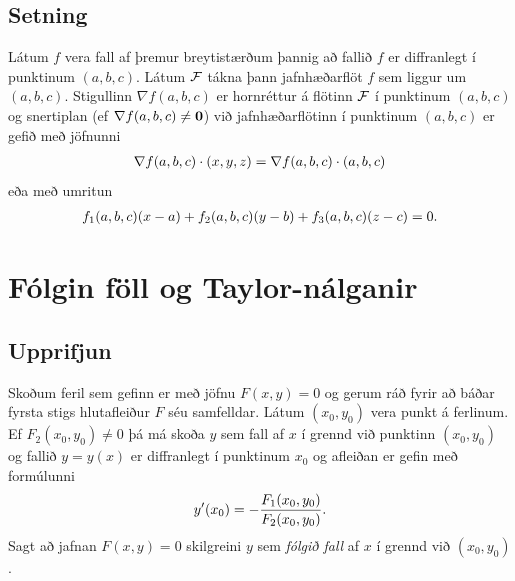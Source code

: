 \documentclass[a4paper,10pt,icelandic]{sphinxmanual}
\begin{document}
\subsection{Setning}
\label{Kafli2:id48}
Látum \(f\) vera fall af þremur breytistærðum þannig að fallið
\(f\) er diffranlegt í punktinum \((a,b,c)\). Látum
\(\cal F\) tákna þann jafnhæðarflöt \(f\) sem liggur um
\((a,b,c)\). Stigullinn \(\nabla f(a,b,c)\) er hornréttur á
flötinn \(\cal F\) í punktinum \((a,b,c)\) og snertiplan (ef
\(\nabla f(a,b,c)\neq\mbox{${\bf 0}$}\)) við jafnhæðarflötinn í
punktinum \((a,b,c)\) er gefið með jöfnunni
\begin{gather}
\begin{split}\displaystyle \nabla f(a,b,c)\cdot(x,y,z)=\nabla f(a,b,c)\cdot(a,b,c)\end{split}\notag
\end{gather}
eða með umritun
\begin{gather}
\begin{split}\displaystyle f_1(a,b,c)(x-a)+f_2(a,b,c)(y-b)+f_3(a,b,c)(z-c)=0.\end{split}\notag
\end{gather}

\section{Fólgin föll og Taylor-nálganir}
\label{Kafli2:folgin-foll-og-taylor-nalganir}

\subsection{Upprifjun}
\label{Kafli2:upprifjun}\label{Kafli2:index-25}
Skoðum feril sem gefinn er með jöfnu \(F(x,y)=0\) og gerum ráð fyrir
að báðar fyrsta stigs hlutafleiður \(F\) séu samfelldar. Látum
\((x_0,y_0)\) vera punkt á ferlinum. Ef \(F_2(x_0,y_0)\neq 0\)
þá má skoða \(y\) sem fall af \(x\) í grennd við punktinn
\((x_0,y_0)\) og fallið \(y=y(x)\) er diffranlegt í punktinum
\(x_0\) og afleiðan er gefin með formúlunni
\begin{gather}
\begin{split}\displaystyle y'(x_0)=-\frac{F_1(x_0,y_0)}{F_2(x_0,y_0)}.\end{split}\notag
\end{gather}
Sagt að jafnan \(F(x,y)=0\) skilgreini \(y\) sem \emph{fólgið fall}
af \(x\) í grennd við \((x_0,y_0)\).
\end{document}
